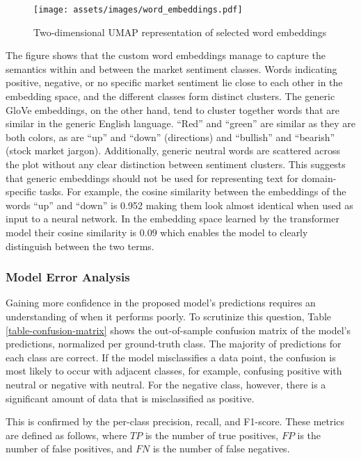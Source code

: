 \begin{figure}[!ht]
	\texttt{[image: assets/images/word\_embeddings.pdf]}
	\caption{Two-dimensional UMAP representation of selected word embeddings}
	\label{figure-tsne-word-embeddings}
\end{figure}

The figure shows that the custom word embeddings manage to capture the semantics within and between the market sentiment classes. Words indicating positive, negative, or no specific market sentiment lie close to each other in the embedding space, and the different classes form distinct clusters. The generic GloVe embeddings, on the other hand, tend to cluster together words that are similar in the generic English language. ``Red'' and ``green'' are similar as they are both colors, as are ``up'' and ``down'' (directions) and ``bullish'' and ``bearish'' (stock market jargon). Additionally, generic neutral words are scattered across the plot without any clear distinction between sentiment clusters. This suggests that generic embeddings should not be used for representing text for domain-specific tasks. For example, the cosine similarity between the embeddings of the words ``up'' and ``down'' is 0.952 making them look almost identical when used as input to a neural network. In the embedding space learned by the transformer model their cosine similarity is $0.09$ which enables the model to clearly distinguish between the two terms.


\subsubsection{Model Error Analysis}

\label{section-model-error-analysis}
Gaining more confidence in the proposed model's predictions requires an understanding of when it performs poorly. To scrutinize this question, Table \ref{table-confusion-matrix} shows the out-of-sample confusion matrix of the model's predictions, normalized per ground-truth class. The majority of predictions for each class are correct. If the model misclassifies a data point, the confusion is most likely to occur with adjacent classes, for example, confusing positive with neutral or negative with neutral. For the negative class, however, there is a significant amount of data that is misclassified as positive.





This is confirmed by the per-class precision, recall, and F1-score. These metrics are defined as follows, where $TP$ is the number of true positives, $FP$ is the number of false positives, and $FN$ is the number of false negatives.

